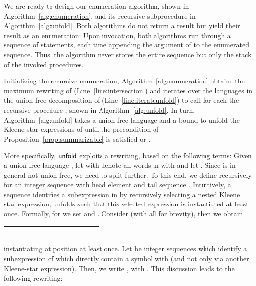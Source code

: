 \documentclass[envcountsame]{llncs}
\newcommand{\unfold}{\ensuremath{{\sf unfold}}\xspace}
\begin{document}
We are ready to design our enumeration algorithm, shown in
Algorithm~\ref{alg:enumeration}, and its recursive subprocedure in
Algorithm~\ref{alg:unfold}.
Both algorithms do not return a result but yield their result as an
enumeration: Upon invocation, both algorithms run through a sequence
of \Yield statements, each time appending the argument of \Yield to
the enumerated sequence.
Thus, the algorithm never stores the entire sequence but only the
stack of the invoked procedures.



Initializing the recursive enumeration,
Algorithm~\ref{alg:enumeration} obtains the maximum rewriting  of  (Line~\ref{line:intersection}) and
iterates over the languages  in the union-free decomposition of 
(Line~\ref{line:iterateunfold}) to call for each  the recursive
procedure , shown in Algorithm~\ref{alg:unfold}.
In turn, Algorithm~\ref{alg:unfold} takes a union free language
 and a bound  to
unfold the Kleene-star expressions of  until the precondition of
Proposition~\ref{prop:summarizable} is satisfied or
.



More specifically, \unfold exploits a rewriting, based on the
following terms:
Given a union free language , let
 with  denote all
words  in  with  and let .
Since  is in general not union free, we need to split 
further. 
To this end, we define  recursively for an integer
sequence  with head element  and
tail sequence .
Intuitively, a sequence  identifies a subexpression in  by
recursively selecting a nested Kleene star expression;
 unfolds  such that this selected expression
is instantiated at least once. 
Formally, for  we set
 and .
Consider  (with
all  for brevity), then we obtain 
\vspace*{-.5em}\begin{center}\begin{tabular}{cccccccccccc}
     &  &  &  & \multicolumn{4}{c}{} &
     &  \\
    &  &  &  &  &
     &  &  &  &  \\
    &  &  &  &  & 
    &  &  &  & 
\end{tabular}\end{center}\vspace*{-.5em}
instantiating  at position  at least once. 
Let  be integer sequences which identify a
subexpression of  which directly contain a symbol  with
 (and not only via another
Kleene-star expression).
Then, we write ,
with .
This discussion leads to the following rewriting:
\end{document}
